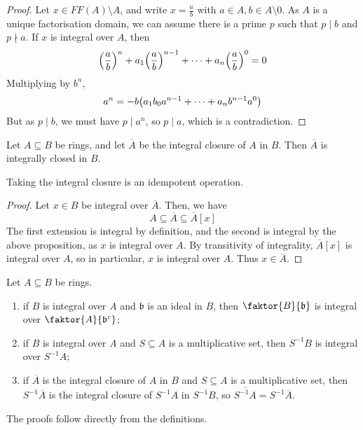 \begin{proof}
    Let \( x \in FF(A) \setminus A \), and write \( x = \frac{a}{b} \) with \( a \in A, b \in A \setminus \qty{0} \).
    As \( A \) is a unique factorisation domain, we can assume there is a prime \( p \) such that \( p \mid b \) and \( p \nmid a \).
    If \( x \) is integral over \( A \), then
    \[ \qty(\frac{a}{b})^n + a_1 \qty(\frac{a}{b})^{n-1} + \dots + a_n \qty(\frac{a}{b})^0 = 0 \]
    Multiplying by \( b^n \),
    \[ a^n = - b \qty(a_1 b_0 a^{n-1} + \dots + a_n b^{n-1} a^0) \]
    But as \( p \mid b \), we must have \( p \mid a^n \), so \( p \mid a \), which is a contradiction.
\end{proof}
\begin{lemma}
    Let \( A \subseteq B \) be rings, and let \( \overline A \) be the integral closure of \( A \) in \( B \).
    Then \( \overline A \) is integrally closed in \( B \). 
\end{lemma}
Taking the integral closure is an idempotent operation.
\begin{proof}
    Let \( x \in B \) be integral over \( \overline A \).
    Then, we have
    \[ A \subseteq \overline A \subseteq \overline A[x] \]
    The first extension is integral by definition, and the second is integral by the above proposition, as \( x \) is integral over \( \overline A \).
    By transitivity of integrality, \( \overline A[x] \) is integral over \( A \), so in particular, \( x \) is integral over \( A \).
    Thus \( x \in \overline A \).
\end{proof}
\begin{proposition}
    Let \( A \subseteq B \) be rings.
    \begin{enumerate}
        \item if \( B \) is integral over \( A \) and \( \mathfrak b \) is an ideal in \( B \), then \( \faktor{B}{\mathfrak b} \) is integral over \( \faktor{A}{\mathfrak b^c} \);
        \item if \( B \) is integral over \( A \) and \( S \subseteq A \) is a multiplicative set, then \( S^{-1}B \) is integral over \( S^{-1}A \);
        \item if \( \overline A \) is the integral closure of \( A \) in \( B \) and \( S \subseteq A \) is a multiplicative set, then \( S^{-1} \overline A \) is the integral closure of \( S^{-1} A \) in \( S^{-1} B \), so \( \overline{S^{-1}A} = S^{-1}\overline A \).
    \end{enumerate}
\end{proposition}
The proofs follow directly from the definitions.
